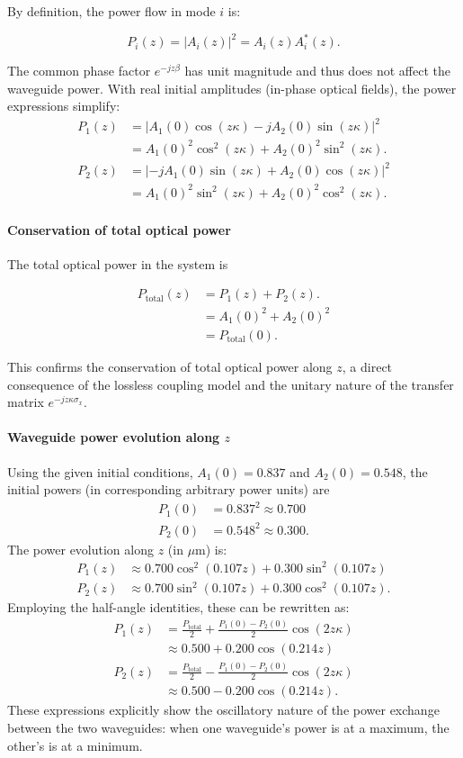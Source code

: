 \documentclass[10pt, a4paper]{article}
\begin{document}
By definition, the power flow in mode $i$ is:

\[P_i(z)=|A_i(z)|^2 = A_i(z)A_i^*(z).\]

The common phase factor $e^{-jz\beta}$ has unit magnitude and thus does not affect the waveguide power. With real initial amplitudes (in-phase optical fields), the power expressions simplify:
\begin{align}
P_1(z) &= |A_1(0)\cos(z\kappa) - jA_2(0)\sin(z\kappa)|^2 \nonumber \\
       &= A_1(0)^2\cos^2(z\kappa) + A_2(0)^2\sin^2(z\kappa). \\
P_2(z) &= |-jA_1(0)\sin(z\kappa) + A_2(0)\cos(z\kappa)|^2 \nonumber \\
       &= A_1(0)^2\sin^2(z\kappa) + A_2(0)^2\cos^2(z\kappa).
\end{align}

\paragraph{Conservation of total optical power}
The total optical power in the system is

\begin{align}
    P_{\text{total}}(z) &= P_1(z) + P_2(z).\\
    &= A_1(0)^2 + A_2(0)^2 \\
    &= P_{\text{total}}(0).
\end{align}

This confirms the conservation of total optical power along $z$, a direct consequence of the lossless coupling model and the unitary nature of the transfer matrix $e^{-jz\kappa\sigma_x}$.

\paragraph{Waveguide power evolution along $z$}
Using the given initial conditions, $A_1(0) = 0.837$ and $A_2(0) = 0.548$, the initial powers (in corresponding arbitrary power units) are
\begin{align}
P_1(0) &= 0.837^2 \approx 0.700 \\
P_2(0) &= 0.548^2 \approx 0.300.
\end{align}
The power evolution along $z$ (in $\mu\text{m}$) is:
\begin{align}
P_1(z) &\approx 0.700 \cos^2(0.107z) + 0.300 \sin^2(0.107z) \\
P_2(z) &\approx 0.700 \sin^2(0.107z) + 0.300 \cos^2(0.107z).
\end{align}
Employing the half-angle identities, these can be rewritten as:
\begin{align}
P_1(z) &= \frac{P_{\text{total}}}{2} + \frac{P_1(0)-P_2(0)}{2}\cos(2z\kappa) \\
&\approx 0.500 + 0.200 \cos(0.214z) \\
P_2(z) &= \frac{P_{\text{total}}}{2} - \frac{P_1(0)-P_2(0)}{2}\cos(2z\kappa) \\
&\approx 0.500 - 0.200 \cos(0.214z).
\end{align}
These expressions explicitly show the oscillatory nature of the power exchange between the two waveguides: when one waveguide's power is at a maximum, the other's is at a minimum.
\end{document}
